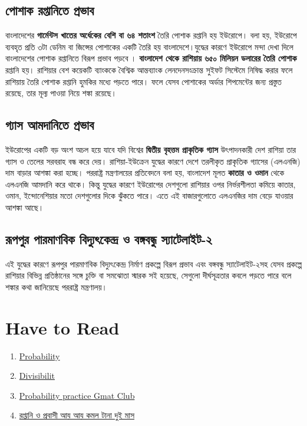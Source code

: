 \documentclass[11pt]{article}
\begin{document}
\subsection{পোশাক রপ্তানিতে প্রভাব}
\label{sec:org54251d4}
বাংলাদেশের \textbf{গার্মেন্টস খাতের অর্ধেকের বেশি বা ৬৪ শতাংশ} তৈরি পোশাক রপ্তানি
হয় ইউরোপে। বলা হয়, ইউরোপে ব্যবহৃত প্রতি ৩টা ডেনিম বা জিন্সের পোশাকের
একটি তৈরি হয় বাংলাদেশে।যুদ্ধের কারণে ইউরোপে মন্দা দেখা দিলে বাংলাদেশের
পোশাক রপ্তানিতে বিরূপ প্রভাব পড়বে । \textbf{বাংলাদেশ থেকে রাশিয়ায় ৬৫০ মিলিয়ন
ডলারের তৈরি পোশাক} রপ্তানি হয়। রাশিয়ার বেশ কয়েকটি ব্যাংককে বৈশ্বিক
আন্তব্যাংক লেনদেনসংক্রান্ত সুইফট সিস্টেমে নিষিদ্ধ করার ফলে রাশিয়ায় তৈরি
পোশাক রপ্তানি হুমকির মধ্যে পড়তে পারে। ফলে যেসব পোশাকের অর্ডার শিপমেন্টের
জন্য প্রস্তুত রয়েছে, তার মূল্য পাওয়া নিয়ে শঙ্কা রয়েছে।

\subsection{গ্যাস আমদানিতে প্রভাব}
\label{sec:orgde6a472}
ইউরোপের একটি বড় অংশ অচল হয়ে যাবে যদি বিশ্বের \textbf{দ্বিতীয় বৃহত্তম প্রাকৃতিক গ্যাস}
উৎপাদনকারী দেশ রাশিয়া তার গ্যাস ও তেলের সরবরাহ বন্ধ করে দেয়।
রাশিয়া-ইউক্রেন যুদ্ধের কারণে দেশে তরলীকৃত প্রাকৃতিক গ্যাসের (এলএনজি) দাম
বাড়ার আশঙ্কা করা হচ্ছে। পররাষ্ট্র মন্ত্রণালয়ের প্রতিবেদনে বলা হয়, বাংলাদেশ
মূলত \textbf{কাতার ও ওমান} থেকে এলএনজি আমদানি করে থাকে। কিন্তু যুদ্ধের কারণে ইউরোপের
দেশগুলো রাশিয়ার ওপর নির্ভরশীলতা কমিয়ে কাতার, ওমান, ইন্দোনেশিয়ার মতো
দেশগুলোর দিকে ঝুঁকতে পারে। এতে এই বাজারগুলোতে এলএনজির দাম বেড়ে যাওয়ার
আশঙ্কা আছে।
\subsection{রূপপুর পারমাণবিক বিদ্যুৎকেন্দ্র ও বঙ্গবন্ধু স্যাটেলাইট-২}
\label{sec:org955ef91}
এই যুদ্ধের কারণে রূপপুর পারমাণবিক বিদ্যুৎকেন্দ্র নির্মাণ প্রকল্পে বিরূপ প্রভাব এবং
বঙ্গবন্ধু স্যাটেলাইট-২সহ যেসব প্রকল্পে রাশিয়ার বিভিন্ন প্রতিষ্ঠানের সঙ্গে চুক্তি
বা সমঝোতা স্মারক সই হয়েছে, সেগুলো দীর্ঘসূত্রতার কবলে পড়তে পারে বলে শঙ্কার
কথা জানিয়েছে পররাষ্ট্র মন্ত্রণালয়।

\section{Have to Read}
\label{sec:org269bda4}

\begin{enumerate}
\item \href{https://magoosh.com/gmat/gmat-probability-questions/}{Probability}
\item \href{//WWW.YOUTUBE.COM/WATCH?V=74HW-FS0IVI\&T=33S}{Divisibilit}
\item \href{//WWW.gmatprepnow.com/module/gmat-probability/video/754}{Probability practice Gmat Club}
\item \href{https://www.prothomalo.com/business/wjhmt1mvri}{রপ্তানি ও প্রবাসী আয় আয় কমল টানা দুই মাস}
\end{enumerate}
\end{document}
